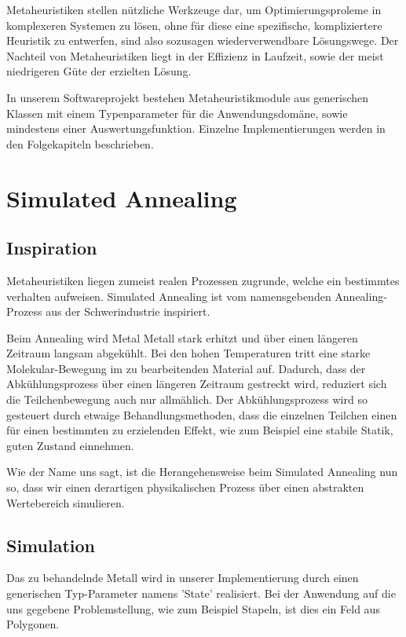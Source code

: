 \documentclass[runningheads,a4paper]{llncs}
\begin{document}
Metaheuristiken stellen nützliche Werkzeuge dar, um Optimierungsproleme in komplexeren Systemen zu lösen, ohne für diese eine spezifische, kompliziertere Heuristik zu entwerfen, sind also sozusagen wiederverwendbare Lösungswege. Der Nachteil von Metaheuristiken liegt in der Effizienz in Laufzeit, sowie der meist niedrigeren Güte der erzielten Lösung.

In unserem Softwareprojekt bestehen Metaheuristikmodule aus generischen Klassen mit einem Typenparameter für die Anwendungsdomäne, sowie mindestens einer Auswertungsfunktion. Einzelne Implementierungen werden in den Folgekapiteln beschrieben.


\section{Simulated Annealing}

\subsection{Inspiration}

Metaheuristiken liegen zumeist realen Prozessen zugrunde, welche ein bestimmtes verhalten aufweisen. Simulated Annealing ist vom namensgebenden Annealing-Prozess aus der Schwerindustrie inspiriert.

Beim Annealing wird Metal Metall stark erhitzt und über einen längeren Zeitraum langsam abgekühlt. Bei den hohen Temperaturen tritt eine starke Molekular-Bewegung im zu bearbeitenden Material auf. Dadurch, dass der Abkühlungsprozess über einen längeren Zeitraum gestreckt wird, reduziert sich die Teilchenbewegung auch nur allmählich. Der Abkühlungsprozess wird so gesteuert durch etwaige Behandlungsmethoden, dass die einzelnen Teilchen einen für einen bestimmten zu erzielenden Effekt, wie zum Beispiel eine stabile Statik, guten Zustand einnehmen.

Wie der Name uns sagt, ist die Herangehensweise beim Simulated Annealing nun so, dass wir einen derartigen physikalischen Prozess über einen abstrakten Wertebereich simulieren.

\subsection{Simulation}

Das zu behandelnde Metall wird in unserer Implementierung durch einen generischen Typ-Parameter namens 'State' realisiert. Bei der Anwendung auf die uns gegebene Problemstellung, wie zum Beispiel Stapeln, ist dies ein Feld aus Polygonen.
\end{document}
